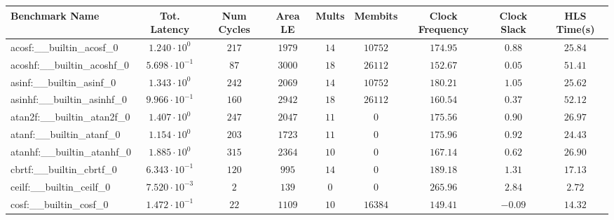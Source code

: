 \begin{tabular}{|l|c|c|c|c|c|c|c|c|}
\hline
Benchmark Name                            & Tot. Latency            & Num Cycles & Area LE   & Mults   & Membits    & Clock Frequency & Clock Slack & HLS Time(s) \\
\hline
acosf:\_\_builtin\_acosf\_0               & $ 1.240 \cdot 10^{0}  $ & $ 217    $ & $ 1979  $ & $ 14  $ & $ 10752  $ & $ 174.95      $ & $ 0.88    $ & $ 25.84   $ \\
acoshf:\_\_builtin\_acoshf\_0             & $ 5.698 \cdot 10^{-1} $ & $ 87     $ & $ 3000  $ & $ 18  $ & $ 26112  $ & $ 152.67      $ & $ 0.05    $ & $ 51.41   $ \\
asinf:\_\_builtin\_asinf\_0               & $ 1.343 \cdot 10^{0}  $ & $ 242    $ & $ 2069  $ & $ 14  $ & $ 10752  $ & $ 180.21      $ & $ 1.05    $ & $ 25.62   $ \\
asinhf:\_\_builtin\_asinhf\_0             & $ 9.966 \cdot 10^{-1} $ & $ 160    $ & $ 2942  $ & $ 18  $ & $ 26112  $ & $ 160.54      $ & $ 0.37    $ & $ 52.12   $ \\
atan2f:\_\_builtin\_atan2f\_0             & $ 1.407 \cdot 10^{0}  $ & $ 247    $ & $ 2047  $ & $ 11  $ & $ 0      $ & $ 175.56      $ & $ 0.90    $ & $ 26.97   $ \\
atanf:\_\_builtin\_atanf\_0               & $ 1.154 \cdot 10^{0}  $ & $ 203    $ & $ 1723  $ & $ 11  $ & $ 0      $ & $ 175.96      $ & $ 0.92    $ & $ 24.43   $ \\
atanhf:\_\_builtin\_atanhf\_0             & $ 1.885 \cdot 10^{0}  $ & $ 315    $ & $ 2364  $ & $ 10  $ & $ 0      $ & $ 167.14      $ & $ 0.62    $ & $ 26.90   $ \\
cbrtf:\_\_builtin\_cbrtf\_0               & $ 6.343 \cdot 10^{-1} $ & $ 120    $ & $ 995   $ & $ 14  $ & $ 0      $ & $ 189.18      $ & $ 1.31    $ & $ 17.13   $ \\
ceilf:\_\_builtin\_ceilf\_0               & $ 7.520 \cdot 10^{-3} $ & $ 2      $ & $ 139   $ & $ 0   $ & $ 0      $ & $ 265.96      $ & $ 2.84    $ & $ 2.72    $ \\
cosf:\_\_builtin\_cosf\_0                 & $ 1.472 \cdot 10^{-1} $ & $ 22     $ & $ 1109  $ & $ 10  $ & $ 16384  $ & $ 149.41      $ & $ -0.09   $ & $ 14.32   $ \\

\end{tabular}
